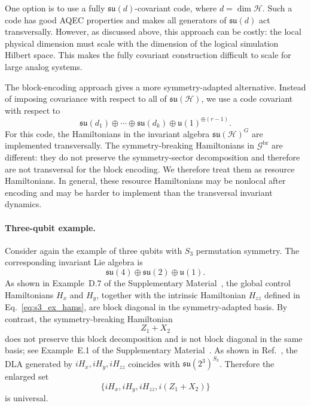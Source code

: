 \documentclass[10pt,twocolumn,superscriptaddress,aps,amsmath,amssymb,citeautoscript,floatfix,prx,longbibliography]{revtex4-2}
\newcounter{alg}
\theoremstyle{plain}
\theoremstyle{plain}
\theoremstyle{plain}
\theoremstyle{plain}
\theoremstyle{plain}
\theoremstyle{plain}
\begin{document}
One option is to use a fully $\mathfrak{su}(d)$-covariant code, where $d=\dim\mathcal H$. Such a code has good AQEC properties and makes all generators of $\mathfrak{su}(d)$ act transversally. However, as discussed above, this approach can be costly: the local physical dimension must scale with the dimension of the logical simulation Hilbert space. This makes the fully covariant construction difficult to scale for large analog systems.

The block-encoding approach gives a more symmetry-adapted alternative. Instead of imposing covariance with respect to all of $\mathfrak{su}(\mathcal H)$, we use a code covariant with respect to
$$
\mathfrak{su}(d_1)
\oplus
\cdots
\oplus
\mathfrak{su}(d_k)
\oplus
\mathfrak{u}(1)^{\oplus(r-1)} .
$$
For this code, the Hamiltonians in the invariant algebra $\mathfrak{su}(\mathcal H)^G$ are implemented transversally. The symmetry-breaking Hamiltonians in $\mathcal G^{\mathrm{br}}$ are different: they do not preserve the symmetry-sector decomposition and therefore are not transversal for the block encoding. We therefore treat them as resource Hamiltonians. In general, these resource Hamiltonians may be nonlocal after encoding and may be harder to implement than the transversal invariant dynamics.

\paragraph{Three-qubit example.}

Consider again the example of three qubits with $S_3$ permutation symmetry. The corresponding invariant Lie algebra is
$$
\mathfrak{su}(4)
\oplus
\mathfrak{su}(2)
\oplus
\mathfrak{u}(1).
$$
As shown in Example~D.7 of the Supplementary Material~\cite{SuppMat}, the global control Hamiltonians $H_x$ and $H_y$, together with the intrinsic Hamiltonian $H_{zz}$ defined in Eq.~\eqref{eq:s3_ex_hams}, are block diagonal in the symmetry-adapted basis. By contrast, the symmetry-breaking Hamiltonian
$$
Z_1+X_2
$$
does not preserve this block decomposition and is not block diagonal in the same basis; see Example~E.1 of the Supplementary Material~\cite{SuppMat}. As shown in Ref.~\cite{Albertini2018}, the DLA generated by ${iH_x,iH_y,iH_{zz}}$ coincides with $\mathfrak{su}(2^3)^{S_3}$. Therefore the enlarged set
$$
\{iH_x,iH_y,iH_{zz},i(Z_1+X_2)\}
$$
is universal.
\end{document}
